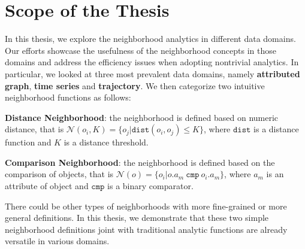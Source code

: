 \section{Scope of the Thesis}
In this thesis, we explore the neighborhood analytics in
different data domains. Our efforts showcase the usefulness of the neighborhood
concepts in those domains and address the efficiency issues when adopting
nontrivial analytics. In particular, we looked at three most prevalent data domains, namely \textbf{attributed graph},
\textbf{time series} and \textbf{trajectory}. 
We then categorize two intuitive neighborhood functions as follows:

\textbf{Distance Neighborhood}: the neighborhood is defined based on numeric distance, that is $\mathcal{N}(o_i,K) = \{o_j | \mathtt{dist}(o_i,o_j) \leq K \}$, where $\mathtt{dist}$ is a distance function and $K$ is a distance threshold.

\textbf{Comparison Neighborhood}: the neighborhood is defined based on the comparison of objects, that is $\mathcal{N}(o) = \{o_i | o.a_m \ \mathtt{cmp} \ o_i.a_m\}$, where $a_m$ is an attribute of object
and $\mathtt{cmp}$ is a binary comparator.


There could be other types of neighborhoods with more fine-grained or more general definitions. 
In this thesis, we demonstrate
that these two simple neighborhood definitions
joint with traditional analytic functions are already versatile 
in various domains. 


